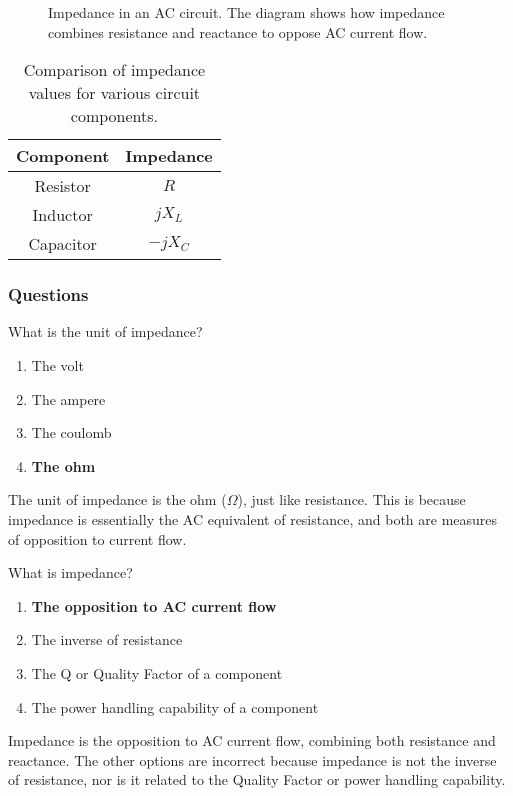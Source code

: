 \begin{figure}[h]
    \centering
    \caption{Impedance in an AC circuit. The diagram shows how impedance combines resistance and reactance to oppose AC current flow.}
    \label{fig:impedance-circuit}
\end{figure}

\begin{table}[h]
    \centering
    \begin{tabular}{|c|c|}
        \hline
        \textbf{Component} & \textbf{Impedance} \\
        \hline
        Resistor & \( R \) \\
        Inductor & \( jX_L \) \\
        Capacitor & \( -jX_C \) \\
        \hline
    \end{tabular}
    \caption{Comparison of impedance values for various circuit components.}
    \label{tab:impedance-values}
\end{table}

\subsubsection*{Questions}
\begin{tcolorbox}[colback=gray!10!white,colframe=black!75!black,title={T5C05}]
    What is the unit of impedance?
    \begin{enumerate}[label=\Alph*),noitemsep]
        \item The volt
        \item The ampere
        \item The coulomb
        \item \textbf{The ohm}
    \end{enumerate}
\end{tcolorbox}
The unit of impedance is the ohm (\( \Omega \)), just like resistance. This is because impedance is essentially the AC equivalent of resistance, and both are measures of opposition to current flow.

\begin{tcolorbox}[colback=gray!10!white,colframe=black!75!black,title={T5C12}]
    What is impedance?
    \begin{enumerate}[label=\Alph*),noitemsep]
        \item \textbf{The opposition to AC current flow}
        \item The inverse of resistance
        \item The Q or Quality Factor of a component
        \item The power handling capability of a component
    \end{enumerate}
\end{tcolorbox}
Impedance is the opposition to AC current flow, combining both resistance and reactance. The other options are incorrect because impedance is not the inverse of resistance, nor is it related to the Quality Factor or power handling capability.

